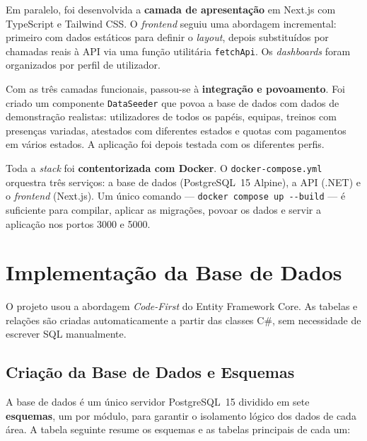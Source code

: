 Em paralelo, foi desenvolvida a \textbf{camada de apresentação} em Next.js com TypeScript e Tailwind CSS. O \textit{frontend} seguiu uma abordagem incremental: primeiro com dados estáticos para definir o \textit{layout}, depois substituídos por chamadas reais à API via uma função utilitária \texttt{fetchApi}. Os \textit{dashboards} foram organizados por perfil de utilizador.

Com as três camadas funcionais, passou-se à \textbf{integração e povoamento}. Foi criado um componente \texttt{DataSeeder} que povoa a base de dados com dados de demonstração realistas: utilizadores de todos os papéis, equipas, treinos com presenças variadas, atestados com diferentes estados e quotas com pagamentos em vários estados. A aplicação foi depois testada com os diferentes perfis.

Toda a \textit{stack} foi \textbf{contentorizada com Docker}. O \texttt{docker-compose.yml} orquestra três serviços: a base de dados (PostgreSQL~15 Alpine), a API (.NET) e o \textit{frontend} (Next.js). Um único comando --- \texttt{docker compose up -{}-build} --- é suficiente para compilar, aplicar as migrações, povoar os dados e servir a aplicação nos portos 3000 e 5000.


\section{Implementação da Base de Dados}

O projeto usou a abordagem \textit{Code-First} do Entity Framework Core. As tabelas e relações são criadas automaticamente a partir das classes C\#, sem necessidade de escrever SQL manualmente.

\subsection{Criação da Base de Dados e Esquemas}

A base de dados é um único servidor PostgreSQL~15 dividido em sete \textbf{esquemas}, um por módulo, para garantir o isolamento lógico dos dados de cada área. A tabela seguinte resume os esquemas e as tabelas principais de cada um:

